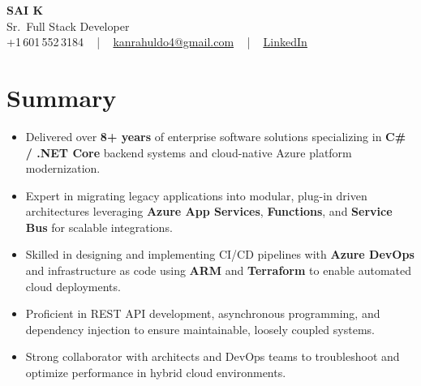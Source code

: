 \documentclass[letterpaper,11pt]{article}
\newcommand{\resumeItem}[1]{
  \item\footnotesize{
    {#1 \vspace{-2pt}}
  }
}
\newcommand{\resumeItemListStart}{\begin{itemize}[leftmargin=*]}
\newcommand{\resumeItemListEnd}{\end{itemize}\vspace{-5pt}}
\begin{document}
\begin{center}
    {\fontsize{14pt}{12pt}\selectfont \textbf{\MakeUppercase{Sai K}}}\\ \vspace{2pt}
    \fontsize{10pt}{12pt}\selectfont Sr.\ Full Stack Developer\\ \vspace{2pt}
    \fontsize{10pt}{12pt}\selectfont +1\,601\,552\,3184 ~ | ~
    \href{mailto:kanrahuldo4@gmail.com}{kanrahuldo4@gmail.com} ~ | ~
    \href{https://www.linkedin.com/in/srrrk/}{\color{blue}\underline{LinkedIn}}
    \vspace{-10pt}
\end{center}

\section{Summary}
\fontsize{9pt}{10pt}\selectfont
\resumeItemListStart
  \resumeItem{Delivered over \textbf{8+ years} of enterprise software solutions specializing in \textbf{C\# / .NET Core} backend systems and cloud-native Azure platform modernization.}
  \resumeItem{Expert in migrating legacy applications into modular, plug-in driven architectures leveraging \textbf{Azure App Services}, \textbf{Functions}, and \textbf{Service Bus} for scalable integrations.}
  \resumeItem{Skilled in designing and implementing CI/CD pipelines with \textbf{Azure DevOps} and infrastructure as code using \textbf{ARM} and \textbf{Terraform} to enable automated cloud deployments.}
  \resumeItem{Proficient in REST API development, asynchronous programming, and dependency injection to ensure maintainable, loosely coupled systems.}
  \resumeItem{Strong collaborator with architects and DevOps teams to troubleshoot and optimize performance in hybrid cloud environments.}
\resumeItemListEnd
\vspace{-6pt}

\end{document}
